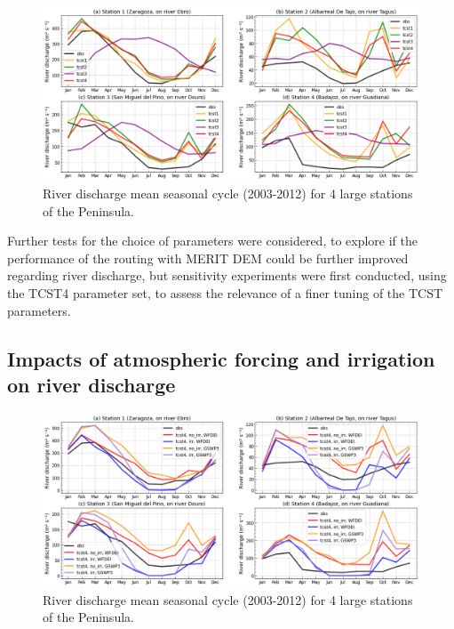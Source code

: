 \begin{figure}[htbp]
    \centering
    \includegraphics[width=\textwidth]{images/chap3/river_discharge/merit_tcst_4stations_SC.png}
    \caption{River discharge mean seasonal cycle (2003-2012) for 4 large stations of the Peninsula.}
    \label{fig:merit_tcsts_stations_SC}
\end{figure}

Further tests for the choice of parameters were considered, to explore if the performance of the \native routing with MERIT DEM could be further improved regarding river discharge, but sensitivity experiments were first conducted, using the TCST4 parameter set, to assess the relevance of a finer tuning of the TCST parameters.

\subsection{Impacts of atmospheric forcing and irrigation on river discharge}

\begin{figure}[htbp]
    \centering
    \includegraphics[width=\textwidth]{images/chap3/river_discharge/merit_forcing_4stations_SC.png}
    \caption{River discharge mean seasonal cycle (2003-2012) for 4 large stations of the Peninsula.}
    \label{fig:merit_forcing_stations_SC}
\end{figure}

